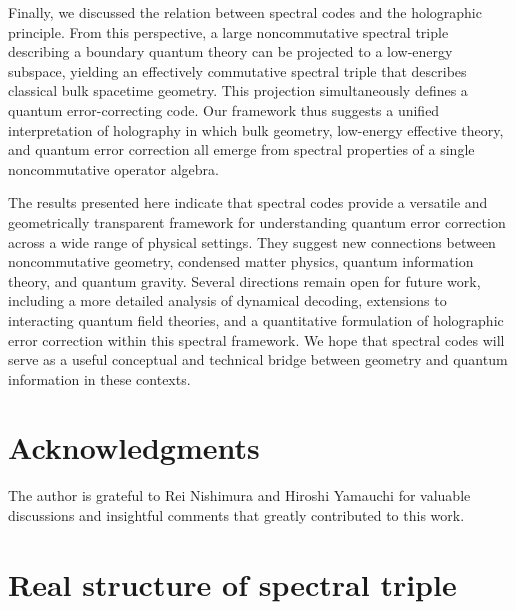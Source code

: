 \documentclass[12pt]{article}
\theoremstyle{definition} %
\theoremstyle{plain} %
\theoremstyle{remark} %
\theoremstyle{underline}
\begin{document}
Finally, we discussed the relation between spectral codes and the holographic principle.
From this perspective, a large noncommutative spectral triple describing a boundary quantum theory can be projected to a low-energy subspace, yielding an effectively commutative spectral triple that describes classical bulk spacetime geometry.
This projection simultaneously defines a quantum error-correcting code.
Our framework thus suggests a unified interpretation of holography in which bulk geometry, low-energy effective theory, and quantum error correction all emerge from spectral properties of a single noncommutative operator algebra.

The results presented here indicate that spectral codes provide a versatile and geometrically transparent framework for understanding quantum error correction across a wide range of physical settings.
They suggest new connections between noncommutative geometry, condensed matter physics, quantum information theory, and quantum gravity.
Several directions remain open for future work, including a more detailed analysis of dynamical decoding, extensions to interacting quantum field theories, and a quantitative formulation of holographic error correction within this spectral framework.
We hope that spectral codes will serve as a useful conceptual and technical bridge between geometry and quantum information in these contexts.


\section*{Acknowledgments}

The author is grateful to Rei Nishimura and Hiroshi Yamauchi for valuable discussions and insightful comments that greatly contributed to this work.

\appendix
{}
\setcounter{equation}{0}


\newpage

\section{Real structure of spectral triple}\label{app:real}
\end{document}
